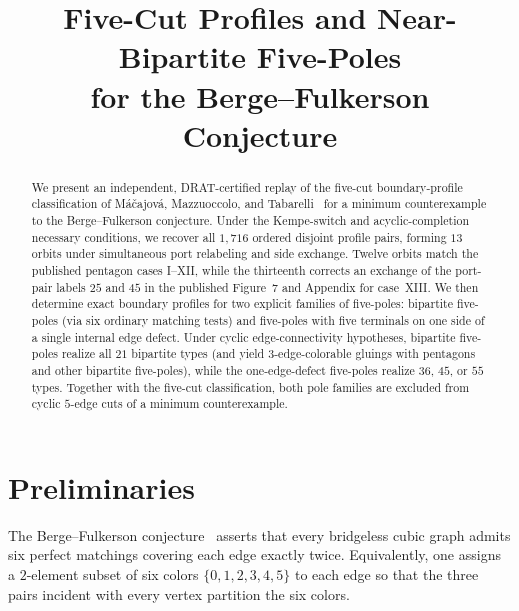 \documentclass[11pt]{article}
\title{Five-Cut Profiles and Near-Bipartite Five-Poles\\for the Berge--Fulkerson Conjecture}
\author{}
\date{}
\theoremstyle{remark}
\begin{document}
\maketitle

\begin{abstract}
We present an independent, DRAT-certified replay of the five-cut boundary-profile
classification of M\'{a}\v{c}ajov\'{a}, Mazzuoccolo, and Tabarelli~\cite{MMT} for a
minimum counterexample to the Berge--Fulkerson conjecture. Under the Kempe-switch and
acyclic-completion necessary conditions, we recover all $1{,}716$ ordered disjoint
profile pairs, forming $13$ orbits under simultaneous port relabeling and side exchange.
Twelve orbits match the published pentagon cases I--XII, while the thirteenth corrects
an exchange of the port-pair labels $25$ and $45$ in the published Figure~7 and Appendix
for case~XIII. We then determine exact boundary profiles for two explicit families of
five-poles: bipartite five-poles (via six ordinary matching tests) and five-poles with
five terminals on one side of a single internal edge defect. Under cyclic edge-connectivity
hypotheses, bipartite five-poles realize all $21$ bipartite types (and yield
$3$-edge-colorable gluings with pentagons and other bipartite five-poles), while the
one-edge-defect five-poles realize $36$, $45$, or $55$ types. Together with the
five-cut classification, both pole families are excluded from cyclic $5$-edge cuts of a
minimum counterexample.
\end{abstract}

\section{Preliminaries}

The Berge--Fulkerson conjecture~\cite{Fulkerson1971} asserts that every bridgeless cubic
graph admits six perfect matchings covering each edge exactly twice. Equivalently, one
assigns a $2$-element subset of six colors $\{0,1,2,3,4,5\}$ to each edge so that the
three pairs incident with every vertex partition the six colors.
\end{document}
